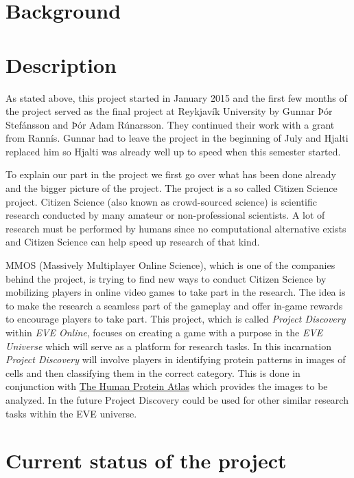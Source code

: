 \documentclass[11pt]{article}
\begin{document}

\date{\today}
\clearpage



\section*{Background}
\section*{Description}
As stated above, this project started in January 2015 and the first few months of the project served as the final project at Reykjavík University by Gunnar Þór Stefánsson and Þór Adam Rúnarsson. They continued their work with a grant from Rannís. Gunnar had to leave the project in the beginning of July and Hjalti replaced him so Hjalti was already well up to speed when this semester started. 
 
To explain our part in the project we first go over what has been done already and the bigger picture of the project. The project is a so called Citizen Science project. Citizen Science (also known as crowd-sourced science) is scientific research conducted by many amateur or non-professional scientists. A lot of research must be performed by humans since no computational alternative exists and Citizen Science can help speed up research of that kind. 

MMOS (Massively Multiplayer Online Science), which is one of the companies behind the project, is trying to find new ways to conduct Citizen Science by mobilizing players in online video games to take part in the research. The idea is to make the research a seamless part of the gameplay and offer in-game rewards to encourage players to take part. This project, which is called \emph{Project Discovery} within \emph{EVE Online}, focuses on creating a game with a purpose in the \emph{EVE Universe} which will serve as a platform for research tasks. In this incarnation \emph{Project Discovery} will involve players in identifying protein patterns in images of cells and then classifying them in the correct category. This is done in conjunction with \href{http://www.proteinatlas.org/subcellular}{The Human Protein Atlas} which provides the images to be analyzed. In the future Project Discovery could be used for other similar research tasks within the EVE universe.

\section*{Current status of the project}
\end{document}
